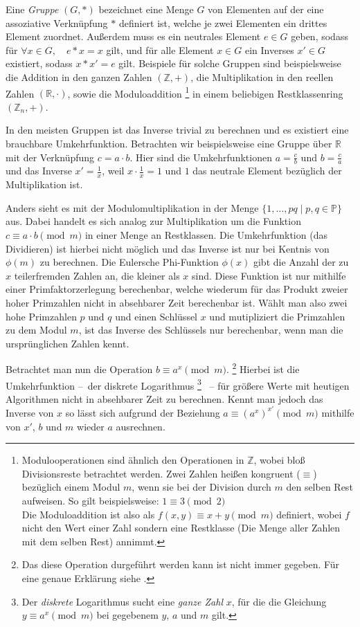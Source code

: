 Eine \emph{Gruppe} $(G,*)$ bezeichnet eine Menge $G$ von Elementen auf der eine assoziative Verknüpfung $*$ definiert ist, welche je zwei Elementen ein drittes Element zuordnet.
Außerdem muss es ein neutrales Element $e \in G$ geben, sodass für $\forall x \in G, \quad e*x=x$ gilt, und für alle Element $x \in G$ ein Inverses $x' \in G$ existiert, sodass $x*x'=e$ gilt.
Beispiele für solche Gruppen sind beispielsweise die Addition in den ganzen Zahlen $(\mathbb{Z}, +)$, die Multiplikation in den reellen Zahlen $(\mathbb{R}, \cdot)$, sowie die Moduloaddition%
\footnote{Modulooperationen sind ähnlich den Operationen in $\mathbb{Z}$, wobei bloß Divisionsreste betrachtet werden.
Zwei Zahlen heißen kongruent ($\equiv$) bezüglich einem Modul $m$, wenn sie bei der Division durch $m$ den selben Rest aufweisen.
So gilt beispielsweise: $1 \equiv 3 \pmod{2}$ \\
Die Moduloaddition ist also als $f(x,y) \equiv x+y \pmod{m}$ definiert, wobei $f$ nicht den Wert einer Zahl sondern eine Restklasse (Die Menge aller Zahlen mit dem selben Rest) annimmt.}
in einem beliebigen Restklassenring $(\mathbb{Z}_n, +)$.

In den meisten Gruppen ist das Inverse trivial zu berechnen und es existiert eine brauchbare Umkehrfunktion.
Betrachten wir beispielsweise eine Gruppe über $\mathbb{R}$ mit der Verknüpfung $c = a \cdot b$.
Hier sind die Umkehrfunktionen $a = \frac{c}{b}$ und $b = \frac{c}{a}$ und das Inverse $x'=\frac{1}{x}$, weil $x \cdot \frac{1}{x} = 1$ und $1$ das neutrale Element bezüglich der Multiplikation ist.

Anders sieht es mit der Modulomultiplikation in der Menge $\{ 1, \dotsc, pq \mid p,q \in \mathbb{P}\}$ aus.
Dabei handelt es sich analog zur Multiplikation um die Funktion $c \equiv a \cdot b \pmod{m}$ in einer Menge an Restklassen.
Die Umkehrfunktion (das Dividieren) ist hierbei nicht möglich und das Inverse ist nur bei Kentnis von $\phi(m)$ zu berechnen.
Die Eulersche Phi-Funktion $\phi(x)$ gibt die Anzahl der zu $x$ teilerfremden Zahlen an, die kleiner als $x$ sind.
Diese Funktion ist nur mithilfe einer Primfaktorzerlegung berechenbar, welche wiederum für das Produkt zweier hoher Primzahlen nicht in absehbarer Zeit berechenbar ist.
Wählt man also zwei hohe Primzahlen $p$ und $q$ und einen Schlüssel $x$ und mutipliziert die Primzahlen zu dem Modul $m$, ist das Inverse des Schlüssels nur berechenbar, wenn man die ursprünglichen Zahlen kennt.

Betrachtet man nun die Operation $b \equiv a^x \pmod{m}$.%
\footnote{Das diese Operation durgeführt werden kann ist nicht immer gegeben. Für eine genaue Erklärung siehe \cite[157-160]{schmeh2007}.}
Hierbei ist die Umkehrfunktion --~der diskrete Logarithmus%
\footnote{Der \emph{diskrete} Logarithmus sucht eine \emph{ganze Zahl} $x$, für die die Gleichung $y \equiv a^x \pmod{m}$ bei gegebenem $y$, $a$ und $m$ gilt.}
~-- für größere Werte mit heutigen Algorithmen nicht in absehbarer Zeit zu berechnen.
Kennt man jedoch das Inverse von $x$ so lässt sich aufgrund der Beziehung $a \equiv (a^x)^{x'} \pmod{m}$ mithilfe von $x'$, $b$ und $m$ wieder $a$ ausrechnen.

